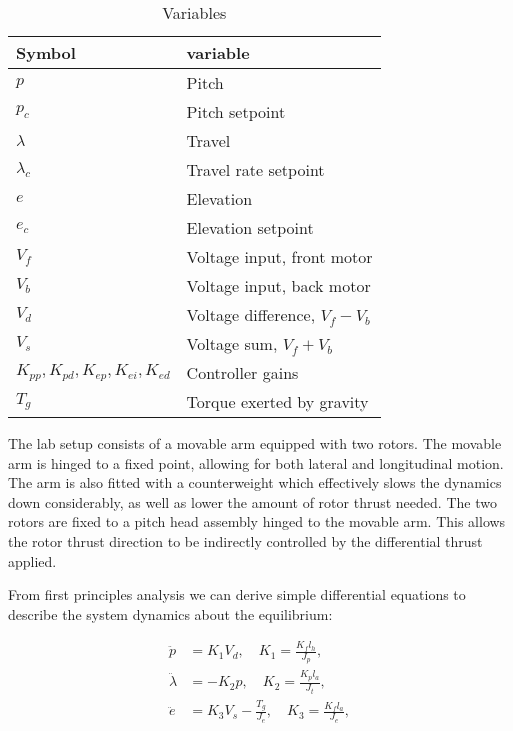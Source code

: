 \begin{table}[p]
	\centering
	\caption{Variables}
	\begin{tabular}{ll}
		\hline
		Symbol & variable \\
		\hline
		$p$ & Pitch \\
		$p_c$ & Pitch setpoint \\
		$\lambda$ & Travel \\
		$\lambda_c$ & Travel rate setpoint \\
		$e$ & Elevation \\
		$e_c$ & Elevation setpoint \\
		$V_f$ & Voltage input, front motor \\
		$V_b$ & Voltage input, back motor \\
		$V_d$ & Voltage difference, $V_f - V_b$ \\
		$V_s$ & Voltage sum, $V_f + V_b$ \\
		$K_{pp}, K_{pd}, K_{ep}, K_{ei}, K_{ed}$ & Controller gains \\
		$T_g$ & Torque exerted by gravity \\
		\hline
	\end{tabular}
	\label{tab:variables}
\end{table}
The lab setup consists of a movable arm equipped with two rotors. The movable arm is hinged to a fixed point, allowing for both lateral and longitudinal motion. The arm is also fitted with a counterweight which effectively slows the dynamics down considerably, as well as lower the amount of rotor thrust needed. The two rotors are fixed to a pitch head assembly hinged to the movable arm. This allows the rotor thrust direction to be indirectly controlled by the differential thrust applied.

From first principles analysis we can derive simple differential equations to describe the system dynamics about the equilibrium:

\begin{subequations}
	\label{eq:dynamics}
	\begin{align}
		\ddot{p} &= K_1 V_d, \quad K_1 = \frac{K_f l_h}{J_p},\\
		\ddot{\lambda} &= -K_2 p, \quad K_2 = \frac{K_p l_a}{J_t},\\
		\ddot{e} &= K_3 V_s - \frac{T_g}{J_e}, \quad K_3 = \frac{K_f l_a}{J_e},
	\end{align}
\end{subequations}
\begin{equation*}
\end{equation*}


